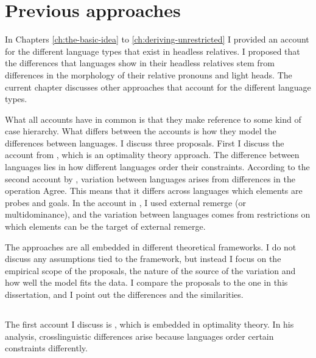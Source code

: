 \chapter{Previous approaches}\label{ch:previous-approaches}

In Chapters \ref{ch:the-basic-idea} to \ref{ch:deriving-unrestricted} I provided an account for the different language types that exist in headless relatives.
I proposed that the differences that languages show in their headless relatives stem from differences in the morphology of their relative pronouns and light heads. The current chapter discusses other approaches that account for the different language types.

What all accounts have in common is that they make reference to some kind of case hierarchy. 
What differs between the accounts is how they model the differences between languages.
I discuss three proposals.
First I discuss the account from \citet{vogel2002}, which is an optimality theory approach. The difference between languages lies in how different languages order their constraints. According to the second account by \citet{himmelreich2017}, variation between languages arises from differences in the operation Agree. This means that it differs across languages which elements are probes and goals. In the account in \citet{bergsma2019}, I used external remerge (or multidominance), and the variation between languages comes from restrictions on which elements can be the target of external remerge.

The approaches are all embedded in different theoretical frameworks. I do not discuss any assumptions tied to the framework, but instead I focus on the empirical scope of the proposals, the nature of the source of the variation and how well the model fits the data. I compare the proposals to the one in this dissertation, and I point out the differences and the similarities.

\section{\citealt{vogel2002}}

The first account I discuss is \citealt{vogel2002}, which is embedded in optimality theory. In his analysis, crosslinguistic differences arise because languages order certain constraints differently.

